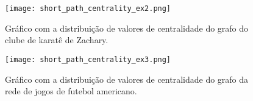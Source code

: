 \begin{figure}[!htb]
	\centering
	\texttt{[image: short\_path\_centrality\_ex2.png]}
	\caption{Gráfico com a distribuição de valores de centralidade do grafo do clube de karatê de Zachary.}
	\label{sec5:short_path_centrality_ex2}
\end{figure}

\begin{figure}[!htb]
	\centering
	\texttt{[image: short\_path\_centrality\_ex3.png]}
	\caption{Gráfico com a distribuição de valores de centralidade do grafo da rede de jogos de futebol americano.}
	\label{sec5:short_path_centrality_ex3}
\end{figure}

